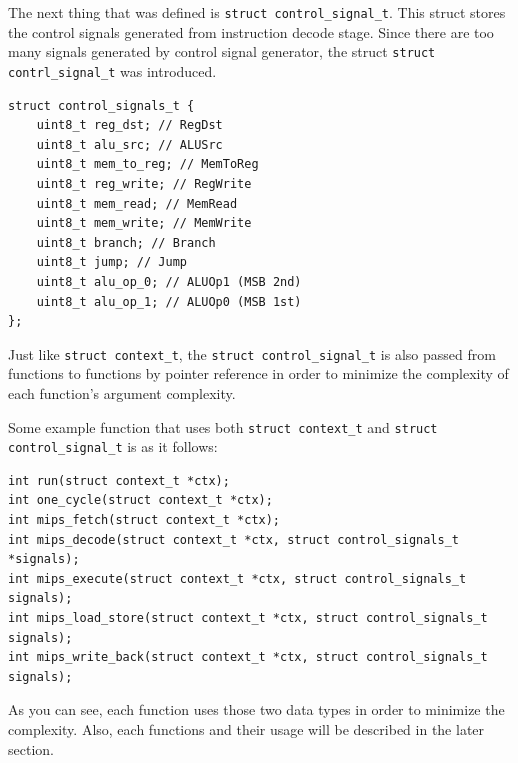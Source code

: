 \documentclass{homework}
\begin{document}
The next thing that was defined is \texttt{struct control_signal_t}. This struct stores the control signals generated from instruction decode stage. Since there are too many signals generated by control signal generator, the struct \texttt{struct contrl_signal_t} was introduced.
\\
\begin{center}
\begin{code}
\begin{verbatim}
struct control_signals_t {
    uint8_t reg_dst; // RegDst
    uint8_t alu_src; // ALUSrc
    uint8_t mem_to_reg; // MemToReg
    uint8_t reg_write; // RegWrite
    uint8_t mem_read; // MemRead
    uint8_t mem_write; // MemWrite
    uint8_t branch; // Branch 
    uint8_t jump; // Jump
    uint8_t alu_op_0; // ALUOp1 (MSB 2nd)
    uint8_t alu_op_1; // ALUOp0 (MSB 1st)
};
\end{verbatim}
\end{code}
\end{center}

Just like \texttt{struct context_t}, the \texttt{struct control_signal_t} is also passed from functions to functions by pointer reference in order to minimize the complexity of each function's argument complexity.

Some example function that uses both \texttt{struct context_t} and \texttt{struct control_signal_t} is as it follows:
\\
\begin{center}
\begin{code}
\begin{verbatim}
int run(struct context_t *ctx);
int one_cycle(struct context_t *ctx);
int mips_fetch(struct context_t *ctx);
int mips_decode(struct context_t *ctx, struct control_signals_t *signals);
int mips_execute(struct context_t *ctx, struct control_signals_t signals);
int mips_load_store(struct context_t *ctx, struct control_signals_t signals);
int mips_write_back(struct context_t *ctx, struct control_signals_t signals);
\end{verbatim}
\end{code}
\end{center}
As you can see, each function uses those two data types in order to minimize the complexity. Also, each functions and their usage will be described in the later section.
\end{document}
